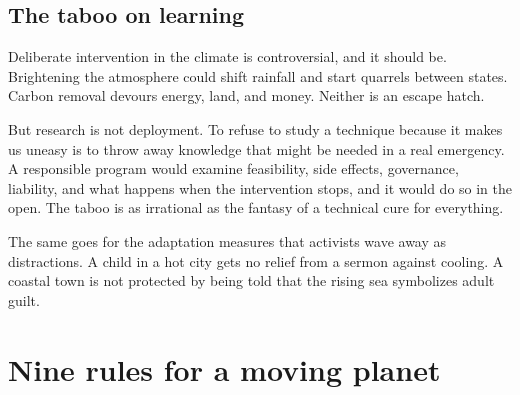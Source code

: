 \documentclass[12pt,a4paper]{book}
\begin{document}
\subsection{The taboo on learning}

Deliberate intervention in the climate is controversial, and it should be. Brightening the atmosphere could shift rainfall and start quarrels between states. Carbon removal devours energy, land, and money. Neither is an escape hatch.

But research is not deployment. To refuse to study a technique because it makes us uneasy is to throw away knowledge that might be needed in a real emergency. A responsible program would examine feasibility, side effects, governance, liability, and what happens when the intervention stops, and it would do so in the open. The taboo is as irrational as the fantasy of a technical cure for everything.

The same goes for the adaptation measures that activists wave away as distractions. A child in a hot city gets no relief from a sermon against cooling. A coastal town is not protected by being told that the rising sea symbolizes adult guilt.

\section{Nine rules for a moving planet}
\end{document}
